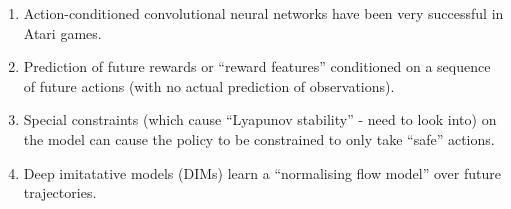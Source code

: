 \documentclass{article}
\begin{document}
\begin{enumerate}
  \item Action-conditioned convolutional neural networks have been very successful in Atari games.
  \item Prediction of future rewards or ``reward features'' conditioned on a sequence of future actions (with no actual prediction of observations).
  \item Special constraints (which cause ``Lyapunov stability'' - need to look into) on the model can cause the policy to be constrained to only take ``safe'' actions.
  \item Deep imitatative models (DIMs) learn a ``normalising flow model'' over future trajectories.
\end{enumerate}
\end{document}
